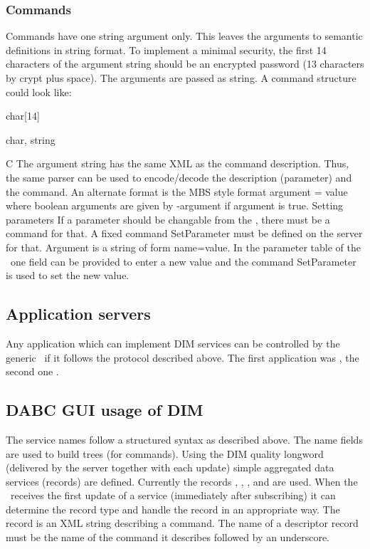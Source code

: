 \subsubsection{Commands}
Commands have one string argument only. This leaves the arguments to semantic definitions in string format. To implement a minimal security, the first 14 characters of the argument string should be an encrypted password (13 characters by crypt plus space). The arguments are passed as string. A command structure could look like:
\bdes
\item[password]   char[14]
\item[argument]   char,  string
\item[Format:] C
\edes
The argument string has the same XML as the command description. Thus, the same parser can be used to encode/decode the description (parameter) and the command. An alternate format is the MBS style format argument = value where boolean arguments are given by -argument if argument is true.
Setting parameters
If a parameter should be changable from the \gui, there must be a command for that. A fixed command SetParameter must be defined on the server for that. Argument is a string of form name=value. In the parameter table of the \gui\ one field can be provided to enter a new value and the command SetParameter is used to set the new value.
\subsection{Application servers}
Any application which can implement DIM services can be controlled by the generic \gui\ if it follows the protocol described above. The first application was \dabc, the second one \mbs.
\subsection{DABC GUI usage of DIM}
The service names follow a structured syntax as described above. The name fields are used to
build trees (for commands). Using the DIM quality longword (delivered by the server together
with each update) simple aggregated data services (records) are defined.
Currently the records , , ,  and 
are used. When the \gui\ receives the first update of a service (immediately after subscribing)
it can determine the record type and handle the record in an appropriate way.
The  record is an XML string describing a command.
The name of a descriptor record must be the name of the command it describes followed by an underscore.
